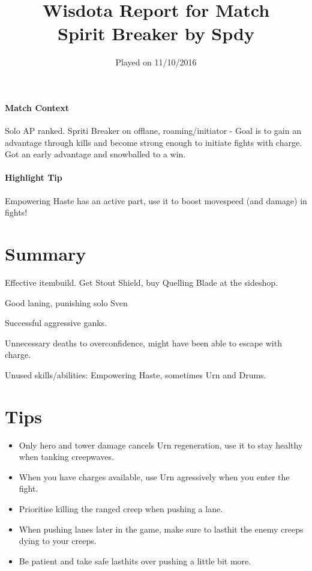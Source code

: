 \documentclass{article}
\title{Wisdota Report for Match \matchid \\
Spirit Breaker by Spdy}
\date{Played on 11/10/2016}
\author{}
\newcommand{\gt}{\ensuremath{\;\;\color{green} \filledmedtriangleup} }
\newcommand{\rt}{\ensuremath{\;\;\color{red} \filledmedtriangledown} }
\newcommand{\ws}{\ensuremath{\;\;\color{white} \filledmedsquare} }
\newenvironment{remarks}
    {
        \begin{description}
            \setlength\itemsep{0em}
    }
    {
        \end{description}
    }
\newcommand{\goodremark}[1]{\item[\gt] #1}
\newcommand{\neutralremark}[1]{\item[\ws] #1}
\newcommand{\badremark}[1]{\item[\rt] #1}
\newcommand{\nnsection}[1]
{\section*{#1}
\addcontentsline{toc}{section}{#1}
}
\begin{document}
\pagecolor{WisdotaBackground}
\color{white}

\maketitle
\thispagestyle{first-page}

\paragraph{Match Context}
Solo AP ranked. Spriti Breaker on offlane, roaming/initiator - Goal is to gain an advantage through kills and become strong enough to initiate fights with charge. Got an early advantage and snowballed to a win.

\paragraph{Highlight Tip}
Empowering Haste has an active part, use it to boost movespeed (and damage) in fights!

\nnsection{Summary}

\begin{remarks}
\goodremark{Effective itembuild. Get Stout Shield, buy Quelling Blade at the sideshop.}
\goodremark{Good laning, punishing solo Sven}
\goodremark{Successful aggressive ganks.}
\neutralremark{Unnecessary deaths to overconfidence, might have been able to escape with charge.}
\badremark{Unused skills/abilities: Empowering Haste, sometimes Urn and Drums. }
\end{remarks}

\section{Tips}

\begin{itemize}
    \item Only hero and tower damage cancels Urn regeneration, use it to stay healthy when tanking creepwaves.
    \item When you have charges available, use Urn agressively when you enter the fight.
    \item Prioritise killing the ranged creep when pushing a lane.
    \item When pushing lanes later in the game, make sure to lasthit the enemy creeps dying to your creeps. 
    \item Be patient and take safe lasthits over pushing a little bit more.
\end{itemize}
\end{document}
